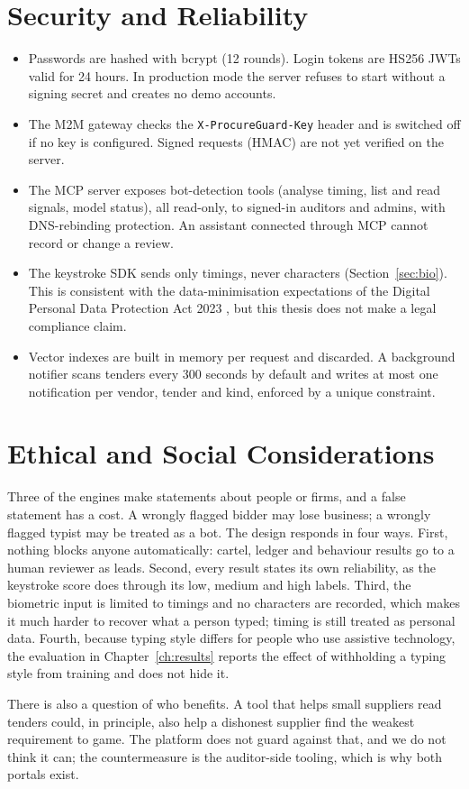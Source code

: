 \section{Security and Reliability}
\begin{itemize}
    \item Passwords are hashed with bcrypt (12 rounds). Login tokens are HS256 JWTs valid for 24 hours. In production mode the server refuses to start without a signing secret and creates no demo accounts.
    \item The M2M gateway checks the \texttt{X-ProcureGuard-Key} header and is switched off if no key is configured. Signed requests (HMAC) are not yet verified on the server.
    \item The MCP server exposes bot-detection tools (analyse timing, list and read signals, model status), all read-only, to signed-in auditors and admins, with DNS-rebinding protection. An assistant connected through MCP cannot record or change a review.
    \item The keystroke SDK sends only timings, never characters (Section~\ref{sec:bio}). This is consistent with the data-minimisation expectations of the Digital Personal Data Protection Act 2023 \cite{dpdp2023}, but this thesis does not make a legal compliance claim.
    \item Vector indexes are built in memory per request and discarded. A background notifier scans tenders every 300 seconds by default and writes at most one notification per vendor, tender and kind, enforced by a unique constraint.
\end{itemize}

\section{Ethical and Social Considerations}
Three of the engines make statements about people or firms, and a false statement has a cost. A wrongly flagged bidder may lose business; a wrongly flagged typist may be treated as a bot. The design responds in four ways. First, nothing blocks anyone automatically: cartel, ledger and behaviour results go to a human reviewer as leads. Second, every result states its own reliability, as the keystroke score does through its low, medium and high labels. Third, the biometric input is limited to timings and no characters are recorded, which makes it much harder to recover what a person typed; timing is still treated as personal data. Fourth, because typing style differs for people who use assistive technology, the evaluation in Chapter~\ref{ch:results} reports the effect of withholding a typing style from training and does not hide it.

There is also a question of who benefits. A tool that helps small suppliers read tenders could, in principle, also help a dishonest supplier find the weakest requirement to game. The platform does not guard against that, and we do not think it can; the countermeasure is the auditor-side tooling, which is why both portals exist.
